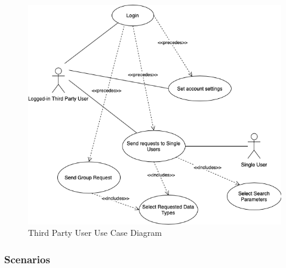 \documentclass[titlepage]{article}
\begin{document}
		\begin{figure}[ht]
  			\includegraphics[width=\linewidth]{Diagrammi/ThirdPartyUseCase.png}
  			\caption{Third Party User Use Case Diagram}
 			 \label{fig:ThirdPartyUseCase}
		\end{figure}

		\subsubsection{Scenarios}
			
\end{document}
